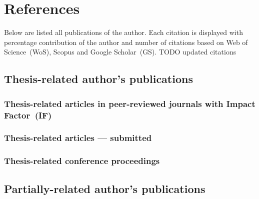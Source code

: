 \documentclass[a4paper,11pt,titlepage,twoside]{book}
\newcommand{\todo}[1]{{\color{red} TODO {#1}}}
\newcommand{\chapternoclear}[1]{
  \begingroup
  \let\cleardoublepage\clearpage
  \chapter{#1}
  \endgroup
}
\begin{document}
\appendix
\renewcommand\chaptername{Appendix}

\chapternoclear{References}

Below are listed all publications of the author.
Each citation is displayed with percentage contribution of the author and number of citations based on Web of Science~(WoS), Scopus and Google Scholar~(GS).
\todo{updated citations}

\section{Thesis-related author's publications}

\subsection*{Thesis-related articles in peer-reviewed journals with Impact Factor~(IF)}
\printbibliography[keyword={mine},keyword={phd_related},keyword={journal},keyword={if},heading=none,title={}]

\subsection*{Thesis-related articles --- submitted}
\printbibliography[keyword={mine},keyword={phd_related},keyword={journal},keyword={submitted},heading=none,title={}]


\subsection*{Thesis-related conference proceedings}
\printbibliography[keyword={mine},keyword={phd_related},keyword={conference},heading=none,title={}]

\section{Partially-related author's publications}
\end{document}
